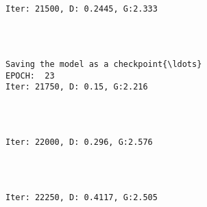 \documentclass[11pt]{article}
\begin{document}
    \begin{center}
    \end{center}
    { \hspace*{\fill} \\}
    
    \begin{Verbatim}[commandchars=\\\{\}]

Iter: 21500, D: 0.2445, G:2.333
    \end{Verbatim}

    \begin{center}
    \end{center}
    { \hspace*{\fill} \\}
    
    \begin{Verbatim}[commandchars=\\\{\}]

Saving the model as a checkpoint{\ldots}
EPOCH:  23
Iter: 21750, D: 0.15, G:2.216
    \end{Verbatim}

    \begin{center}
    \end{center}
    { \hspace*{\fill} \\}
    
    \begin{Verbatim}[commandchars=\\\{\}]

Iter: 22000, D: 0.296, G:2.576
    \end{Verbatim}

    \begin{center}
    \end{center}
    { \hspace*{\fill} \\}
    
    \begin{Verbatim}[commandchars=\\\{\}]

Iter: 22250, D: 0.4117, G:2.505
    \end{Verbatim}
\end{document}
